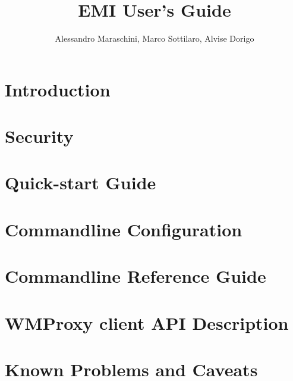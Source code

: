 \documentclass{egee}
\title{EMI User's Guide}
\author{Alessandro Maraschini, Marco Sottilaro, Alvise Dorigo}
\begin{document}


\newpage

\tableofcontents

\newpage

\section{Introduction}
\label{intro}


\newpage
\section{Security}
\label{security}


\newpage
\section{Quick-start Guide}
\label{quickstart}


\newpage
\section{Commandline Configuration}
\label{cliconf}


\newpage
\section{Commandline Reference Guide}
\label{cli}


\newpage
\section{WMProxy client API Description}
\label{api}


\newpage
\section{Known Problems and Caveats}
\label{caveats}



\newpage
\end{document}
